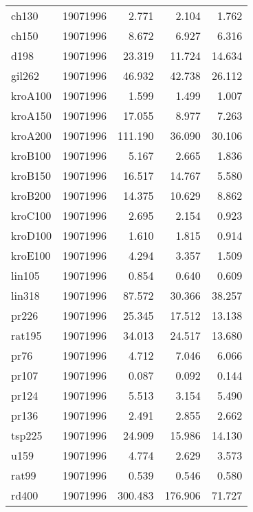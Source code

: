 \begin{center}
\begin{longtable}{llrrr}
ch130  & 19071996 & 2.771 & 2.104 & 1.762\\
ch150  & 19071996 & 8.672 & 6.927 & 6.316\\
d198  & 19071996 & 23.319 & 11.724 & 14.634\\
gil262  & 19071996 & 46.932 & 42.738 & 26.112\\
kroA100  & 19071996 & 1.599 & 1.499 & 1.007\\
kroA150  & 19071996 & 17.055 & 8.977 & 7.263\\
kroA200  & 19071996 & 111.190 & 36.090 & 30.106\\
kroB100  & 19071996 & 5.167 & 2.665 & 1.836\\
kroB150  & 19071996 & 16.517 & 14.767 & 5.580\\
kroB200  & 19071996 & 14.375 & 10.629 & 8.862\\
kroC100  & 19071996 & 2.695 & 2.154 & 0.923\\
kroD100  & 19071996 & 1.610 & 1.815 & 0.914\\
kroE100  & 19071996 & 4.294 & 3.357 & 1.509\\
lin105  & 19071996 & 0.854 & 0.640 & 0.609\\
lin318  & 19071996 & 87.572 & 30.366 & 38.257\\
pr226  & 19071996 & 25.345 & 17.512 & 13.138\\
rat195  & 19071996 & 34.013 & 24.517 & 13.680\\
pr76  & 19071996 & 4.712 & 7.046 & 6.066\\
pr107  & 19071996 & 0.087 & 0.092 & 0.144\\
pr124  & 19071996 & 5.513 & 3.154 & 5.490\\
pr136  & 19071996 & 2.491 & 2.855 & 2.662\\
tsp225  & 19071996 & 24.909 & 15.986 & 14.130\\
u159  & 19071996 & 4.774 & 2.629 & 3.573\\
rat99  & 19071996 & 0.539 & 0.546 & 0.580\\
rd400  & 19071996 & 300.483 & 176.906 & 71.727\\

\end{longtable}
\end{center}

